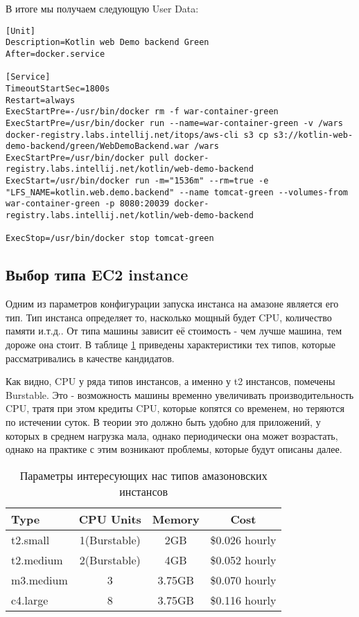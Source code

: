 	В итоге мы получаем следующую User Data:
\begin{lstlisting}
[Unit]
Description=Kotlin web Demo backend Green
After=docker.service

[Service]
TimeoutStartSec=1800s
Restart=always
ExecStartPre=-/usr/bin/docker rm -f war-container-green
ExecStartPre=/usr/bin/docker run --name=war-container-green -v /wars docker-registry.labs.intellij.net/itops/aws-cli s3 cp s3://kotlin-web-demo-backend/green/WebDemoBackend.war /wars
ExecStartPre=/usr/bin/docker pull docker-registry.labs.intellij.net/kotlin/web-demo-backend
ExecStart=/usr/bin/docker run -m="1536m" --rm=true -e "LFS_NAME=kotlin.web.demo.backend" --name tomcat-green --volumes-from war-container-green -p 8080:20039 docker-registry.labs.intellij.net/kotlin/web-demo-backend

ExecStop=/usr/bin/docker stop tomcat-green
\end{lstlisting}

\subsection{Выбор типа EC2 instance}
	Одним из параметров конфигурации запуска инстанса на амазоне является его тип. Тип  инстанса определяет то, насколько мощный будет CPU, количество памяти и.т.д.. От типа машины зависит её стоимость - чем лучше машина, тем дороже она стоит. В таблице \ref{table:instance_types} приведены характеристики тех типов, которые рассматривались в качестве кандидатов.
	
	Как видно, CPU у ряда типов инстансов, а именно у t2 инстансов, помечены Burstable. Это - возможность машины временно увеличивать производительность CPU, тратя при этом кредиты CPU, которые копятся со временем, но теряются по истечении суток. В теории это должно быть удобно для приложений, у которых в среднем нагрузка мала, однако периодически она может возрастать, однако на практике с этим возникают проблемы, которые будут описаны далее.
	
\begin{table}[h]
	\centering
	\begin{tabular}{l|c|c|c}
		Type      & CPU Units    & Memory & Cost\\ \hline
		t2.small  & 1(Burstable) & 2GB    & \$0.026 hourly\\ \hline
		t2.medium & 2(Burstable) & 4GB    & \$0.052 hourly\\ \hline
		m3.medium & 3            & 3.75GB & \$0.070 hourly\\ \hline
		c4.large  & 8            & 3.75GB & \$0.116 hourly\\
	\end{tabular}
	\caption{Параметры интересующих нас типов амазоновских инстансов}
	\label{table:instance_types}
\end{table}
	
